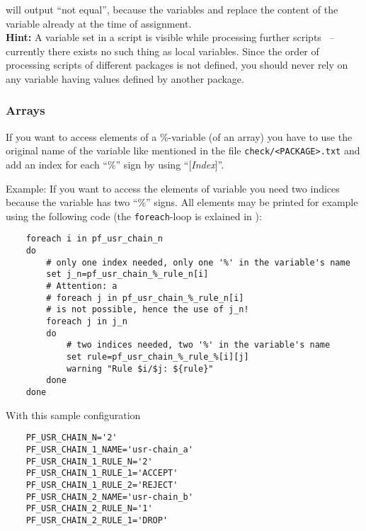     will output ``not equal'', because the variables  and 
    replace the content of the variable  already at the time of assignment.\\

    \textbf{Hint:} A variable set in a script is visible while processing further
    scripts ~-- currently there exists no such thing as local variables. Since the
    order of processing scripts of different packages is not defined, you should
    never rely on any variable having values defined by another package.

\subsubsection{Arrays}

    If you want to access elements of a \%-variable (of an array) you have to use
    the original name of the variable like mentioned in the file \texttt{check/<PACKAGE>.txt}
    and add an index for each ``\%'' sign by using ``[\emph{Index}]''.

    Example: If you want to access the elements of variable
     you need two indices because the
    variable has two ``\%'' signs. All elements may be printed for example
    using the following code (the \texttt{foreach}-loop
    is exlained in ):

\begin{example}
\begin{verbatim}
    foreach i in pf_usr_chain_n
    do
        # only one index needed, only one '%' in the variable's name
        set j_n=pf_usr_chain_%_rule_n[i]
        # Attention: a
        # foreach j in pf_usr_chain_%_rule_n[i]
        # is not possible, hence the use of j_n!
        foreach j in j_n
        do
            # two indices needed, two '%' in the variable's name
            set rule=pf_usr_chain_%_rule_%[i][j]
            warning "Rule $i/$j: ${rule}"
        done
    done
\end{verbatim}
\end{example}

    With this sample configuration

\begin{example}
\begin{verbatim}
    PF_USR_CHAIN_N='2'
    PF_USR_CHAIN_1_NAME='usr-chain_a'
    PF_USR_CHAIN_1_RULE_N='2'
    PF_USR_CHAIN_1_RULE_1='ACCEPT'
    PF_USR_CHAIN_1_RULE_2='REJECT'
    PF_USR_CHAIN_2_NAME='usr-chain_b'
    PF_USR_CHAIN_2_RULE_N='1'
    PF_USR_CHAIN_2_RULE_1='DROP'
\end{verbatim}
\end{example}

